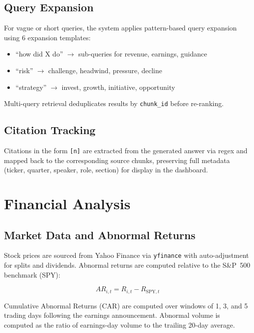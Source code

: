 \documentclass[12pt,a4paper]{article}
\begin{document}
\subsection{Query Expansion}

For vague or short queries, the system applies pattern-based query expansion using 6 expansion templates:
\begin{itemize}[noitemsep]
    \item ``how did X do'' $\to$ sub-queries for revenue, earnings, guidance
    \item ``risk'' $\to$ challenge, headwind, pressure, decline
    \item ``strategy'' $\to$ invest, growth, initiative, opportunity
\end{itemize}

Multi-query retrieval deduplicates results by \texttt{chunk\_id} before re-ranking.

\subsection{Citation Tracking}

Citations in the form \texttt{[n]} are extracted from the generated answer via regex and mapped back to the corresponding source chunks, preserving full metadata (ticker, quarter, speaker, role, section) for display in the dashboard.


\section{Financial Analysis}
\label{sec:finance}

\subsection{Market Data and Abnormal Returns}

Stock prices are sourced from Yahoo Finance via \texttt{yfinance} with auto-adjustment for splits and dividends. Abnormal returns are computed relative to the S\&P~500 benchmark (SPY):

\begin{equation}
    AR_{i,t} = R_{i,t} - R_{\text{SPY},t}
    \label{eq:abnormal-return}
\end{equation}

Cumulative Abnormal Returns (CAR) are computed over windows of 1, 3, and 5 trading days following the earnings announcement. Abnormal volume is computed as the ratio of earnings-day volume to the trailing 20-day average.
\end{document}
